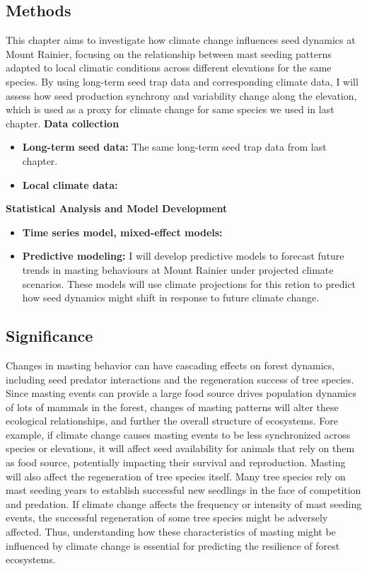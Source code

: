 \documentclass[11pt,letter]{article}
\begin{document}
\subsection{Methods}
This chapter aims to investigate how climate change influences seed dynamics at Mount Rainier, focusing on the relationship between mast seeding patterns adapted to local climatic conditions across different elevations for the same species. By using long-term seed trap data and corresponding climate data, I will assess how seed production synchrony and variability change along the elevation, which is used as a proxy for climate change for same species we used in last chapter.
\textbf{Data collection}\\
\begin{itemize}
\item\textbf{Long-term seed data:} The same long-term seed trap data from last chapter.
\item\textbf{Local climate data:}
\end{itemize}
\textbf{Statistical Analysis and Model Development}\\
\begin{itemize}
\item\textbf{Time series model, mixed-effect models:}
\item\textbf{Predictive modeling:} I will develop predictive models to forecast future trends in masting behaviours at Mount Rainier under projected climate scenarios. These models will use climate projections for this retion to predict how seed dynamics might shift in response to future climate change.
\end{itemize}
\subsection{Significance}
Changes in masting behavior can have cascading effects on forest dynamics, including seed predator interactions and the regeneration success of tree species. Since masting events can provide a large food source drives population dynamics of lots of mammals in the forest, changes of masting patterns will alter these ecological relationships, and further the overall structure of ecosystems. Fore example, if climate change causes masting events to be less synchronized across species or elevations, it will affect seed availability for animals that rely on them as food source, potentially impacting their survival and reproduction.
Masting will also affect the regeneration of tree species itself. Many tree species rely on mast seeding years to establish successful new seedlings in the face of competition and predation. If climate change affects the frequency or intensity of mast seeding events, the successful regeneration of some tree species might be adversely affected. Thus, understanding how these characteristics of masting might be influenced by climate change is essential for predicting the resilience of forest ecosystems.



 
\end{document}

